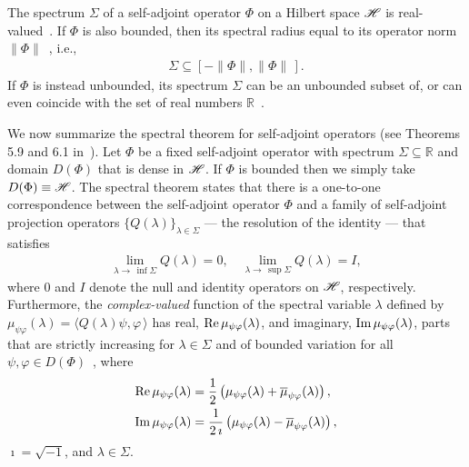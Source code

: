 \documentclass[amsa]{ipart}
\begin{document}
The spectrum $\Sigma$ of a self-adjoint operator $\Phi$ on a Hilbert space
$\mathscr{H}$ is real-valued~\cite{Reed-1980,Stone:64}. If $\Phi$ is also bounded,
then its spectral radius equal to its operator norm
$\|\Phi\|$~\cite{Reed-1980}, i.e., 
%
\begin{align}\label{eq:Spectral_Radius_Phi}
  \Sigma\subseteq[-\|\Phi\|,\|\Phi\|\,].
\end{align}
%
If $\Phi$ is instead unbounded, its spectrum $\Sigma$ can be an unbounded subset of,
or can even coincide with the set of real numbers
$\mathbb{R}$~\cite{Stone:64}.




We now summarize the spectral theorem for self-adjoint
operators (see Theorems 5.9 and  6.1 in~\cite{Stone:64}). Let
$\Phi$ be a fixed self-adjoint operator with spectrum $\Sigma\subseteq\mathbb{R}$ and 
domain $D(\Phi)$ that is dense in $\mathscr{H}$. If $\Phi$ is bounded
then we simply take $D(\Phi)\equiv\mathscr{H}$. The spectral theorem states that 
there is a one-to-one correspondence between the self-adjoint
operator $\Phi$ and a family of self-adjoint projection operators
$\{Q(\lambda)\}_{\lambda\in\Sigma}$ --- the resolution of the identity --- that
satisfies~\cite{Stone:64} 
%
\begin{align}\label{eq:Res_Identity_limits}
  \lim_{\lambda\to\,\inf{\Sigma}}Q(\lambda)=0, \quad
  \lim_{\lambda\to\,\sup{\Sigma}}Q(\lambda)=I,
\end{align}
%
where $0$ and $I$ denote the null and identity operators on $\mathscr{H}$,
respectively. Furthermore, the \emph{complex-valued} function of the
spectral variable $\lambda$ defined by $\mu_{\psi\varphi}(\lambda)=\langle Q(\lambda)\psi,\varphi\,\rangle$ has real,
$\mbox{Re}\,\mu_{\psi\varphi}(\lambda)$, and imaginary, $\mbox{Im}\,\mu_{\psi\varphi}(\lambda)$, parts that are
strictly increasing for $\lambda\in\Sigma$ and of bounded variation for all $\psi,\varphi\in
D(\Phi)$~\cite{Stone:64}, where
%
\begin{align}\label{eq:Fns_Bounded_Var}
  \Real\mu_{\psi\varphi}(\lambda)
         &=\frac{1}{2}\left(\mu_{\psi\varphi}(\lambda)+\overline{\mu}_{\psi\varphi}(\lambda)\right),
  \\
  \Imag\mu_{\psi\varphi}(\lambda)
         &=\frac{1}{2\,\imath}\left(\mu_{\psi\varphi}(\lambda)-\overline{\mu}_{\psi\varphi}(\lambda)\right),
  \notag
\end{align}
%
$\imath=\sqrt{-1}$, and $\lambda\in\Sigma$.
\end{document}
